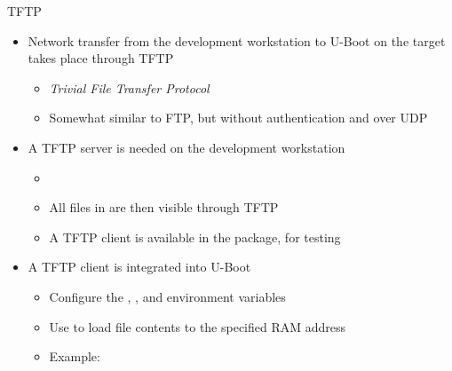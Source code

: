 \begin{frame}{TFTP}
  \begin{itemize}
  \item Network transfer from the development workstation to U-Boot
    on the target takes place through TFTP
    \begin{itemize}
    \item {\em Trivial File Transfer Protocol}
    \item Somewhat similar to FTP, but without authentication and over
      UDP
    \end{itemize}
  \item A TFTP server is needed on the development workstation
    \begin{itemize}
    \item {}
    \item All files in  are then visible through TFTP
    \item A TFTP client is available in the  package,
      for testing
    \end{itemize}
  \item A TFTP client is integrated into U-Boot
    \begin{itemize}
    \item Configure the , , and
       environment variables
    \item Use  to load file contents to
      the specified RAM address
    \item Example: 
    \end{itemize}
  \end{itemize}
\end{frame}

